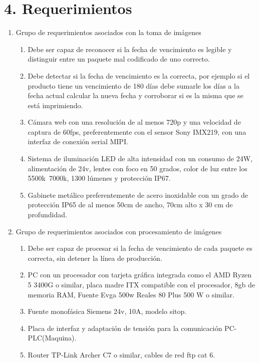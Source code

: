 \documentclass[11pt]{charter}
\begin{document}
\section{4. Requerimientos}
\label{sec:requerimientos}

\begin{enumerate}
\item Grupo de requerimientos asociados con la toma de imágenes
	\begin{enumerate}
	\item Debe ser capaz de reconocer si la fecha de vencimiento es legible y distinguir entre un paquete mal codificado de uno correcto.
	\item Debe detectar si la fecha de vencimiento es la correcta, por ejemplo si el producto tiene un vencimiento de 180 días debe sumarle los días a la fecha actual calcular la nueva fecha y corroborar si es la misma que se está imprimiendo. 
	\item Cámara web con una resolución de al menos 720p y una velocidad de captura de 60fps, preferentemente con el sensor Sony IMX219, con una interfaz de conexión serial MIPI.
	\item Sistema de iluminación LED de alta intensidad con un consumo de 24W, alimentación de 24v, lentes con foco en 50 grados, color de luz entre los 5500k~7000k, 1300 lúmenes y protección IP67.
	\item Gabinete metálico preferentemente de acero inoxidable con un grado de protección IP65 de al menos 50cm de ancho, 70cm alto x 30 cm de profundidad.
	\end{enumerate}
\item Grupo de requerimientos asociados con procesamiento de imágenes
	\begin{enumerate}
	\item Debe ser capaz de procesar si la fecha de vencimiento de cada paquete es correcta, sin detener la línea de producción.
	\item PC con un procesador con tarjeta gráfica integrada como el AMD Ryzen 5 3400G o similar, placa madre ITX compatible con el procesador, 8gb de memoria RAM, Fuente Evga 500w Reales 80 Plus 500 W o similar.
	\item Fuente monofásica Siemens 24v, 10A, modelo sitop.
	\item Placa de interfaz y adaptación de tensión para la comunicación PC-PLC(Maquina).
	\item Router TP-Link Archer C7 o similar, cables de red ftp cat 6. 
	\end{enumerate}
\end{enumerate}
\end{document}
